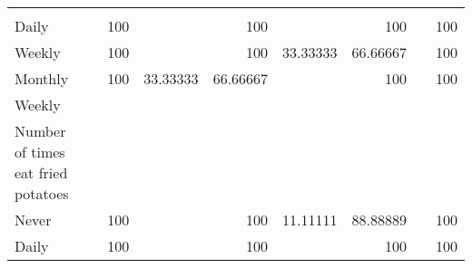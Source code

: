 \documentclass{article}
\begin{document}
\begin{tabular}{lllllllll}
  \multicolumn{1}{r}{} &
  \multicolumn{1}{r}{} &
  \multicolumn{1}{r}{} &
  \multicolumn{1}{r}{} &
  \multicolumn{1}{r}{} &
  \multicolumn{1}{r}{} &
  \multicolumn{1}{r}{} \\
\multicolumn{1}{l}{\hspace{7em}Daily} &
  \multicolumn{1}{|r}{} &
  \multicolumn{1}{r}{100} &
  \multicolumn{1}{r}{} &
  \multicolumn{1}{r}{100} &
  \multicolumn{1}{r}{} &
  \multicolumn{1}{r}{100} &
  \multicolumn{1}{r}{} &
  \multicolumn{1}{r}{100} \\
\multicolumn{1}{l}{\hspace{7em}Weekly} &
  \multicolumn{1}{|r}{} &
  \multicolumn{1}{r}{100} &
  \multicolumn{1}{r}{} &
  \multicolumn{1}{r}{100} &
  \multicolumn{1}{r}{33.33333} &
  \multicolumn{1}{r}{66.66667} &
  \multicolumn{1}{r}{} &
  \multicolumn{1}{r}{100} \\
\multicolumn{1}{l}{\hspace{7em}Monthly} &
  \multicolumn{1}{|r}{} &
  \multicolumn{1}{r}{100} &
  \multicolumn{1}{r}{33.33333} &
  \multicolumn{1}{r}{66.66667} &
  \multicolumn{1}{r}{} &
  \multicolumn{1}{r}{100} &
  \multicolumn{1}{r}{} &
  \multicolumn{1}{r}{100} \\
\multicolumn{1}{l}{\hspace{5em}Weekly} &
  \multicolumn{1}{|r}{} &
  \multicolumn{1}{r}{} &
  \multicolumn{1}{r}{} &
  \multicolumn{1}{r}{} &
  \multicolumn{1}{r}{} &
  \multicolumn{1}{r}{} &
  \multicolumn{1}{r}{} &
  \multicolumn{1}{r}{} \\
\multicolumn{1}{l}{\hspace{6em}Number of times eat fried potatoes} &
  \multicolumn{1}{|r}{} &
  \multicolumn{1}{r}{} &
  \multicolumn{1}{r}{} &
  \multicolumn{1}{r}{} &
  \multicolumn{1}{r}{} &
  \multicolumn{1}{r}{} &
  \multicolumn{1}{r}{} &
  \multicolumn{1}{r}{} \\
\multicolumn{1}{l}{\hspace{7em}Never} &
  \multicolumn{1}{|r}{} &
  \multicolumn{1}{r}{100} &
  \multicolumn{1}{r}{} &
  \multicolumn{1}{r}{100} &
  \multicolumn{1}{r}{11.11111} &
  \multicolumn{1}{r}{88.88889} &
  \multicolumn{1}{r}{} &
  \multicolumn{1}{r}{100} \\
\multicolumn{1}{l}{\hspace{7em}Daily} &
  \multicolumn{1}{|r}{} &
  \multicolumn{1}{r}{100} &
  \multicolumn{1}{r}{} &
  \multicolumn{1}{r}{100} &
  \multicolumn{1}{r}{} &
  \multicolumn{1}{r}{100} &
  \multicolumn{1}{r}{} &
  \multicolumn{1}{r}{100} \\

\end{tabular}
\end{document}

